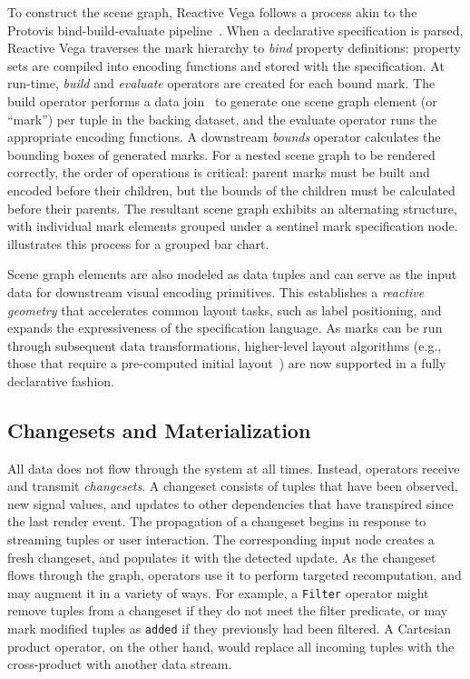 To construct the scene graph, Reactive Vega follows a process akin to the
Protovis bind-build-evaluate pipeline~\cite{heer:protovisjava}. When a
declarative specification is parsed, Reactive Vega traverses the mark hierarchy
to \emph{bind} property definitions: property sets are compiled into encoding
functions and stored with the specification. At run-time, \emph{build} and
\emph{evaluate} operators are created for each bound mark. The build operator
performs a data join~\cite{bostock:d3} to generate one scene graph element (or
``mark'') per tuple in the backing dataset, and the evaluate operator runs the
appropriate encoding functions. A downstream \emph{bounds} operator calculates
the bounding boxes of generated marks. For a nested scene graph to be rendered
correctly, the order of operations is critical: parent marks must be built and
encoded before their children, but the bounds of the children must be calculated
before their parents. The resultant scene graph exhibits an alternating
structure, with individual mark elements grouped under a sentinel mark
specification node.  illustrates this process for a
grouped bar chart.

Scene graph elements are also modeled as data tuples and can serve as the input
data for downstream visual encoding primitives. This establishes a
\emph{reactive geometry} that accelerates common layout tasks, such as label
positioning, and expands the expressiveness of the specification language. As
marks can be run through subsequent data transformations, higher-level layout
algorithms (e.g., those that require a pre-computed initial
layout~\cite{flexbox}) are now supported in a fully declarative fashion.

\subsection{Changesets and Materialization}

All data does not flow through the system at all times. Instead, operators
receive and transmit \emph{changesets}. A changeset consists of tuples that have
been observed, new signal values, and updates to other dependencies that have
transpired since the last render event. The propagation of a changeset begins in
response to streaming tuples or user interaction. The corresponding input node
creates a fresh changeset, and populates it with the detected update. As the
changeset flows through the graph, operators use it to perform targeted
recomputation, and may augment it in a variety of ways. For example, a
\texttt{Filter} operator might remove tuples from a changeset if they do not
meet the filter predicate, or may mark modified tuples as \texttt{added} if they
previously had been filtered. A Cartesian product operator, on the other hand,
would replace all incoming tuples with the cross-product with another data
stream.

